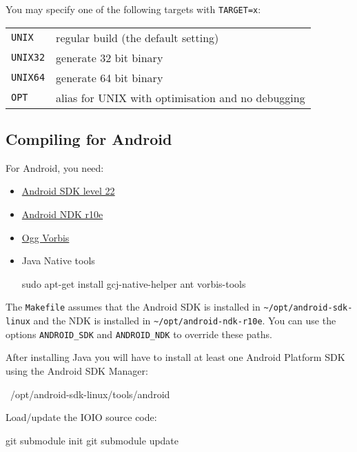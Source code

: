 You may specify one of the following targets with \texttt{TARGET=x}:

\begin{tabular}{lp{8cm}}

\texttt{UNIX} & regular build (the default setting) \\

\texttt{UNIX32} & generate 32 bit binary \\

\texttt{UNIX64} & generate 64 bit binary \\

\texttt{OPT} & alias for UNIX with optimisation and no debugging \\

\end{tabular}

\subsection{Compiling for Android}

For Android, you need:

\begin{itemize}
\item \href{http://developer.android.com/sdk/}{Android SDK level 22}
\item \href{http://developer.android.com/sdk/ndk/}{Android NDK r10e}
\item \href{http://www.vorbis.com/}{Ogg Vorbis}
\item {Java Native tools 
\begin{verbatim*}
sudo apt-get install gcj-native-helper ant vorbis-tools
\end{verbatim*}}
\end{itemize}

The \texttt{Makefile} assumes that the Android SDK is installed in
\verb|~/opt/android-sdk-linux| and the NDK is installed in
\verb|~/opt/android-ndk-r10e|.  You can use the options
\verb|ANDROID_SDK| and \verb|ANDROID_NDK| to override these paths.

After installing Java you will have to install at least one Android Platform SDK using the Android SDK Manager:

\begin{verbatim*}
~/opt/android-sdk-linux/tools/android
\end{verbatim*}

Load/update the IOIO source code:

\begin{verbatim*}
git submodule init
git submodule update
\end{verbatim*}


